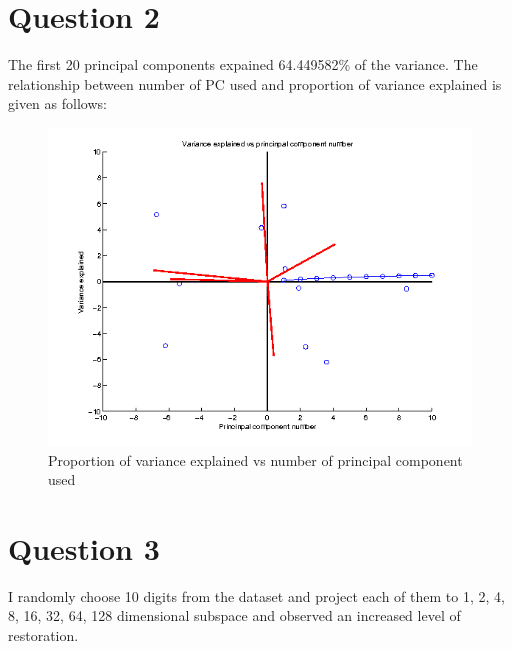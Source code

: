 \documentclass[paper=a4, fontsize=11pt]{scrartcl} %
\numberwithin{equation}{section} %
\numberwithin{figure}{section} %
\numberwithin{table}{section} %
\begin{document}



\section{Question 2}

The first 20 principal components expained 64.449582\% of the variance. The relationship between number of PC used and proportion of variance explained is given as follows:

\begin{figure}[H]
  \centering
  \includegraphics[scale=.7]{variance_explained}
  \caption{Proportion of variance explained vs number of principal component used}
\end{figure}



\section {Question 3}

I randomly choose 10 digits from the dataset and project each of them to 1, 2, 4, 8, 16, 32, 64, 128 dimensional subspace and observed an increased level of restoration.
\end{document}
